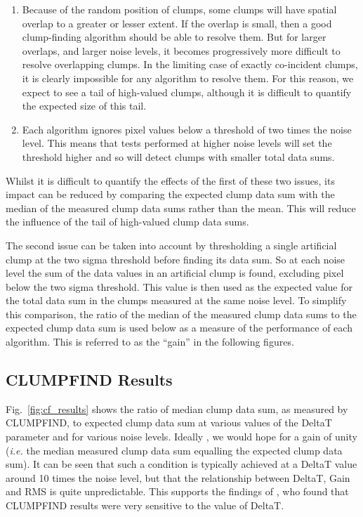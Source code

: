 \documentclass[final,authoryear,5p,times,twocolumn]{elsarticle}
\begin{document}
\begin{enumerate}

\item Because of the random position of clumps, some clumps will have
spatial overlap to a greater or lesser extent. If the overlap is small,
then a good clump-finding algorithm should be able to resolve them. But
for larger overlaps, and larger noise levels, it becomes progressively
more difficult to resolve overlapping clumps. In the limiting case of
exactly co-incident clumps, it is clearly impossible for any algorithm
to resolve them. For this reason, we expect to see a tail of high-valued
clumps, although it is difficult to quantify the expected size of this
tail.

\item Each algorithm ignores pixel values below a threshold of two times the
noise level. This means that tests performed at higher noise levels will
set the threshold higher and so will detect clumps with smaller total
data sums.

\end{enumerate}

Whilst it is difficult to quantify the effects of the first of these two
issues, its impact can be reduced by comparing the expected clump data
sum with the median of the measured clump data sums rather than the mean.
This will reduce the influence of the tail of high-valued clump data sums.

The second issue can be taken into account by thresholding a single artificial
clump at the two sigma threshold before finding its data sum. So at each
noise level the sum of the data values in an artificial clump is found,
excluding pixel below the two sigma threshold. This value is then used as
the expected value for the total data sum in the clumps measured at the
same noise level. To simplify this comparison, the ratio of the median of
the measured clump data sums to the expected clump data sum is used below
as a measure of the performance of each algorithm. This is referred to as
the ``gain'' in the following figures.

\subsection{CLUMPFIND Results}
Fig.~\ref{fig:cf_results} shows the ratio of median clump data sum, as
measured by CLUMPFIND, to expected clump data sum at various values of
the DeltaT parameter and for various noise levels. Ideally , we would
hope for a gain of unity (\emph{i.e.} the median measured clump data sum
equalling the expected clump data sum). It can be seen that such a
condition is typically achieved at a DeltaT value around 10 times the
noise level, but that the relationship between DeltaT, Gain and RMS is
quite unpredictable. This supports the findings of \cite{2009Pineda},
who found that CLUMPFIND results were very sensitive to the value of DeltaT.
\end{document}
